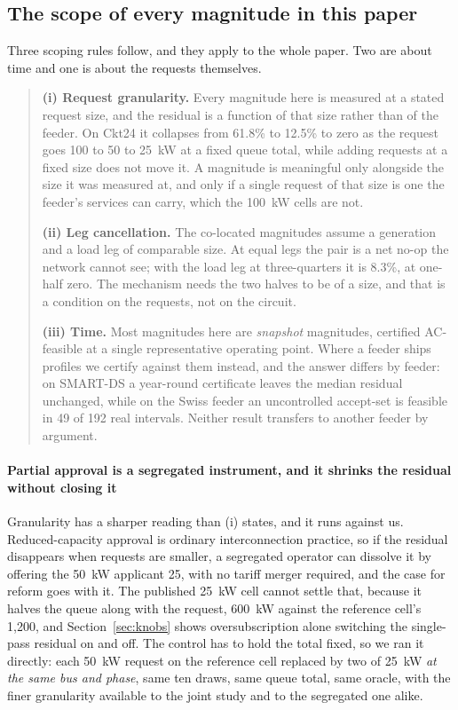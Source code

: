 \documentclass[review,authoryear,12pt]{elsarticle}
\begin{document}
\subsection{The scope of every magnitude in this paper}
\label{sec:scope}

Three scoping rules follow, and they apply to the whole paper. Two are about
time and one is about the requests themselves.

\begin{quote}
\textbf{(i) Request granularity.} Every magnitude here is measured at a stated
request size, and the residual is a function of that size rather than of the
feeder. On Ckt24 it collapses from 61.8\% to 12.5\% to zero as the request goes
100 to 50 to 25~kW at a fixed queue total, while adding requests at a fixed
size does not move it. A magnitude is meaningful only alongside the size it was
measured at, and only if a single request of that size is one the feeder's
services can carry, which the 100~kW cells are not.

\textbf{(ii) Leg cancellation.} The co-located magnitudes assume a generation
and a load leg of comparable size. At equal legs the pair is a net no-op the
network cannot see; with the load leg at three-quarters it is 8.3\%, at
one-half zero. The mechanism needs the two halves to be of a size, and that is
a condition on the requests, not on the circuit.

\textbf{(iii) Time.} Most magnitudes here are \emph{snapshot} magnitudes,
certified AC-feasible at a single representative operating point. Where a
feeder ships profiles we certify against them instead, and the answer differs
by feeder: on SMART-DS a year-round certificate leaves the median residual
unchanged, while on the Swiss feeder an uncontrolled accept-set is feasible in
49 of 192 real intervals. Neither result transfers to another feeder by
argument.
\end{quote}

\paragraph{Partial approval is a segregated instrument, and it shrinks the
residual without closing it}
Granularity has a sharper reading than (i) states, and it runs against us.
Reduced-capacity approval is ordinary interconnection practice, so if the
residual disappears when requests are smaller, a segregated operator can
dissolve it by offering the 50~kW applicant 25, with no tariff merger required,
and the case for reform goes with it. The published 25~kW cell cannot settle
that, because it halves the queue along with the request, 600~kW against the
reference cell's 1{,}200, and Section~\ref{sec:knobs} shows oversubscription
alone switching the single-pass residual on and off. The control has to hold
the total fixed, so we ran it directly: each 50~kW request on the reference
cell replaced by two of 25~kW \emph{at the same bus and phase}, same ten draws,
same queue total, same oracle, with the finer granularity available to the
joint study and to the segregated one alike.
\end{document}
